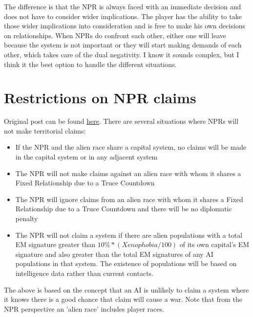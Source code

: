 \documentclass[../Aurora C# unofficial manual.tex]{subfiles}
\begin{document}
	The difference is that the NPR is always faced with an immediate decision and does not have to consider wider implications. The player has the ability to take those wider implications into consideration and is free to make his own decisions on relationships. When NPRs do confront each other, either one will leave because the system is not important or they will start making demands of each other, which takes care of the dual negativity. I know it sounds complex, but I think it the best option to handle the different situations.
	
	
	\section{Restrictions on NPR claims}\label{5_restriction_on_npr_claimes}
	Original post can be found
	\href{http://aurora2.pentarch.org/index.php?topic=8495.msg118404#msg118404}{here}.
	\newline\newline
	There are several situations where NPRs will not make territorial claims:
	\begin{itemize}
		\item If the NPR and the alien race share a capital system, no claims will be made in the capital system or in any adjacent system
		\item The NPR will not make claims against an alien race with whom it shares a Fixed Relationship due to a Truce Countdown
		\item The NPR will ignore claims from an alien race with whom it shares a Fixed Relationship due to a Truce Countdown and there will be no diplomatic penalty
		\item The NPR will not claim a system if there are alien populations with a total EM signature greater than \( 10\% * (Xenophobia / 100) \) of its own capital's EM signature and also greater than the total EM signatures of any AI populations in that system. The existence of populations will be based on intelligence data rather than current contacts.
	\end{itemize}
	The above is based on the concept that an AI is unlikely to claim a system where it knows there is a good chance that claim will cause a war. Note that from the NPR perspective an 'alien race' includes player races.
	
	
\end{document}
